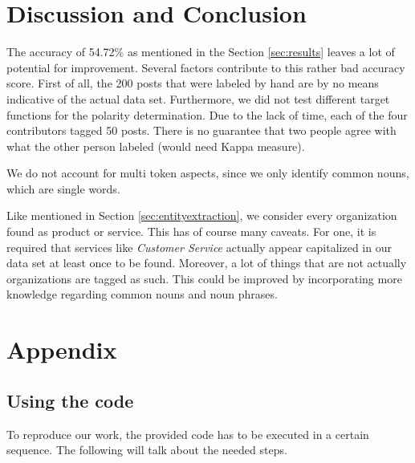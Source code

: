 \documentclass[10pt,a4paper]{article}
\begin{document}
	\section{Discussion and Conclusion}
	The accuracy of 54.72\% as mentioned in the Section \ref{sec:results} leaves a lot of potential for improvement. Several factors contribute to this rather bad accuracy score. First of all, the 200 posts that were labeled by hand are by no means indicative of the actual data set. Furthermore, we did not test different target functions for the polarity determination. Due to the lack of time, each of the four contributors tagged 50 posts. There is no guarantee that two people agree with what the other person labeled (would need Kappa measure).

	We do not account for multi token aspects, since we only identify common nouns, which are single words.

	Like mentioned in Section \ref{sec:entityextraction}, we consider every organization found as product or service. This has of course many caveats. For one, it is required that services like \textit{Customer Service} actually appear capitalized in our data set at least once to be found. Moreover, a lot of things that are not actually organizations are tagged as such. This could be improved by incorporating more knowledge regarding common nouns and noun phrases.
	
	\section{Appendix}
		
		\subsection{Using the code}
		To reproduce our work, the provided code has to be executed in a certain sequence. The following will talk about the needed steps.

	\newpage

	
	
\end{document}
